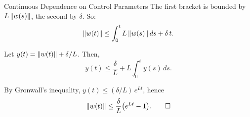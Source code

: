 \documentclass[aspectratio=169]{beamer}
\DeclarePairedDelimiter{\norm}{\lVert}{\rVert}
\newcommand{\backupend}{\setcounter{framenumber}{\value{finalframe}}}
\begin{document}
\begin{frame}{Continuous Dependence on Control Parameters}
The first bracket is bounded by $L\,\norm{w(s)}$, the second by $\delta$. So:
\[
\norm{w(t)} \leq \int_0^t L\,\norm{w(s)}\,ds + \delta\,t.
\]

Let $y(t) = \norm{w(t)} + \delta/L$. Then,
\[
y(t) \leq \frac{\delta}{L} + L\!\int_0^t y(s)\,ds.
\]

By Gronwall's inequality, $y(t) \leq (\delta/L)\,e^{Lt}$, hence
\[
\norm{w(t)} \leq \frac{\delta}{L}\bigl(e^{Lt} - 1\bigr). \qed
\]
\end{frame}

\backupend
\end{document}
